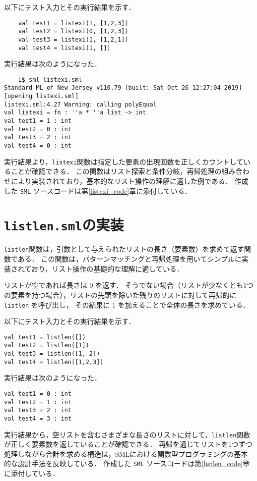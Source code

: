 \documentclass[autodetect-engine,dvi=dvipdfmx,ja=standard,
               a4j,11pt]{bxjsarticle}
\begin{document}
以下にテスト入力とその実行結果を示す．
\begin{Verbatim}
    val test1 = listexi(1, [1,2,3])
    val test2 = listexi(0, [1,2,3])
    val test3 = listexi(1, [1,2,1])
    val test4 = listexi(1, [])    
\end{Verbatim}
実行結果は次のようになった．
\begin{Verbatim}
    L$ sml listexi.sml 
Standard ML of New Jersey v110.79 [built: Sat Oct 26 12:27:04 2019]
[opening listexi.sml]
listexi.sml:4.27 Warning: calling polyEqual
val listexi = fn : ''a * ''a list -> int
val test1 = 1 : int
val test2 = 0 : int
val test3 = 2 : int
val test4 = 0 : int
\end{Verbatim}
実行結果より，\texttt{listexi}関数は指定した要素の出現回数を正しくカウントしていることが確認できる．
この関数はリスト探索と条件分岐，再帰処理の組み合わせにより実装されており，基本的なリスト操作の理解に適した例である．
作成した \texttt{SML} ソースコードは第\ref{listexi_code}章に添付している．
\section{\texttt{listlen.sml}の実装}
\texttt{listlen}関数は，引数として与えられたリストの長さ（要素数）を求めて返す関数である．
この関数は，パターンマッチングと再帰処理を用いてシンプルに実装されており，リスト操作の基礎的な理解に適している．

リストが空であれば長さは 0 を返す．
そうでない場合（リストが少なくとも1つの要素を持つ場合），リストの先頭を除いた残りのリストに対して再帰的に \texttt{listlen} を呼び出し，
その結果に 1 を加えることで全体の長さを求めている．

以下にテスト入力とその実行結果を示す．
\begin{Verbatim}
val test1 = listlen([])
val test2 = listlen([1])
val test3 = listlen([1, 2])
val test4 = listlen([1,2,3])
\end{Verbatim}
実行結果は次のようになった．
\begin{Verbatim}
val test1 = 0 : int
val test2 = 1 : int
val test3 = 2 : int
val test4 = 3 : int  
\end{Verbatim}
実行結果から，空リストを含むさまざまな長さのリストに対して，\texttt{listlen}関数が正しく要素数を返していることが確認できる．
再帰を通じてリストを1つずつ処理しながら合計を求める構造は，SMLにおける関数型プログラミングの基本的な設計手法を反映している．
作成した \texttt{SML} ソースコードは第\ref{listlen_code}章に添付している．
\end{document}
